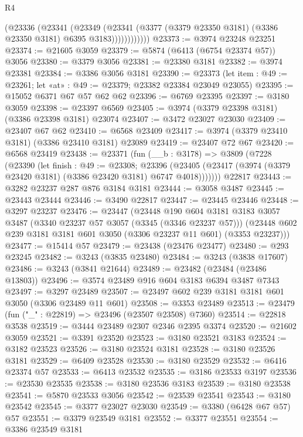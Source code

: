 \begin{lexlean}{R4}
\begin{coremodule}
                  (@23336
                    (@23341
                      (@23349
                        (@23341
                          (@3377 (@3379 @23350 @3181) (@3386 @23350 @3181) @6395 @3183))))))))))))
@23373 := @3974 @23248 @23251
@23374 := @21605 @3059
@23379 := @5874 (@6413 (@6754 @23374 @57)) @3056
@23380 := @3379 @3056
@23381 := @23380 @3181
@23382 := @3974 @23381
@23384 := @3386 @3056 @3181
@23390 := @23373 (let item : @49 := @23261; let «at» : @49 := @23379; @23382 @23384 @23049 @23055)
@23395 := @15052 @6371 @67 @57 @62 @62
@23396 := @6769 @23395
@23397 := @3180 @3059
@23398 := @23397 @6569
@23405 := @3974 (@3379 @23398 @3181) (@3386 @23398 @3181) @23074
@23407 := @3472 @23027 @23030
@23409 := @23407 @67 @62
@23410 := @6568 @23409
@23417 := @3974 (@3379 @23410 @3181) (@3386 @23410 @3181) @23089
@23419 := @23407 @72 @67
@23420 := @6568 @23419
@23438 := @23371
    (fun (__b : @3178) =>
    @3809
      (@7228
        (@23390
          (let finish : @49 := @23308;
          @23396 (@23405 (@23417 (@3974 (@3379 @23420 @3181) (@3386 @23420 @3181) @6747 @4018)))))))
    @22817
@23443 := @3282 @23237 @287 @876 @3184 @3181
@23444 := @3058 @3487
@23445 := @23443 @23444
@23446 := @3490 @22817
@23447 := @23445 @23446
@23448 := @3297 @23237
@23476 := @23447
    (@23448
      @190
      @604
      @3181
      @3183
      @3057
      @3487
      (@3340 @23237 @57 @3057 (@3345 (@3346 @23237 @57)))
      (@23448 @602 @239 @3181 @3181 @601 @3050 (@3306 @23237 @11 @601) (@3353 @23237)))
@23477 := @15414 @57
@23479 := @23438 (@23476 @23477)
@23480 := @293 @23245
@23482 := @3243 (@3835 @23480)
@23484 := @3243 (@3838 @17607)
@23486 := @3243 (@3841 @21644)
@23489 := @23482 (@23484 (@23486 @13803))
@23496 := @3574 @23489 @916 @604 @3183 @6394 @3487 @7343
@23497 := @3297 @23489
@23507 := @23497 @602 @239 @3181 @3181 @601 @3050 (@3306 @23489 @11 @601)
@23508 := @3353 @23489
@23513 := @23479 (fun ("_" : @22819) => @23496 (@23507 @23508) @7360)
@23514 := @22818 @3538
@23519 := @3444 @23489 @2307 @2346 @2395 @3374
@23520 := @21602 @3059
@23521 := @3391 @23520
@23523 := @3180 @23521 @3183
@23524 := @3182 @23523
@23526 := @3180 @23524 @3181
@23528 := @3180 @23526 @3181
@23529 := @6409 @23528
@23530 := @3180 @23529
@23532 := @6416 @23374 @57
@23533 := @6413 @23532
@23535 := @3186 @23533 @3197
@23536 := @23530 @23535
@23538 := @3180 @23536 @3183
@23539 := @3180 @23538
@23541 := @5870 @23533 @3056
@23542 := @23539 @23541
@23543 := @3180 @23542
@23545 := @3377 @23027 @23030
@23549 := @3380 (@6428 @67 @57) @57
@23551 := @3379 @23549 @3181
@23552 := @3377 @23551
@23554 := @3386 @23549 @3181

\end{coremodule}
\end{lexlean}
